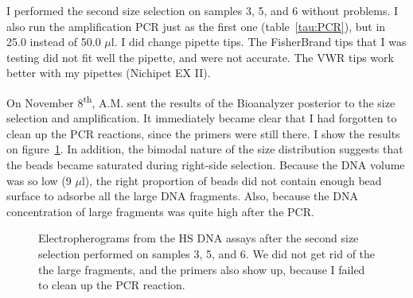\documentclass[a4paper,12pt]{article}
\begin{document}
I performed the second size selection on samples 3, 5, and 6 without problems. I also run the amplification PCR just as the first one (table~\ref{tau:PCR}), but in 25.0 instead of 50.0 $\mu$l. I did change pipette tips. The FisherBrand tips that I was testing did not fit well the pipette, and were not accurate. The VWR tips work better with my pipettes (Nichipet EX II).

On November 8\textsuperscript{th}, A.M. sent the results of the Bioanalyzer posterior to the size selection and amplification. It immediately became clear that I had forgotten to clean up the PCR reactions, since the primers were still there. I show the results on figure~\ref{fig:sizeselection2}. In addition, the bimodal nature of the size distribution suggests that the beads became saturated during right-side selection. Because the DNA volume was so low (9 $\mu$l), the right proportion of beads did not contain enough bead surface to adsorbe all the large DNA fragments. Also, because the DNA concentration of large fragments was quite high after the PCR.

\begin{figure}
\caption{Electropherograms from the HS DNA assays after the second size selection performed on samples 3, 5, and 6. We did not get rid of the the large fragments, and the primers also show up, because I failed to clean up the PCR reaction.}\label{fig:sizeselection2}
\end{figure}
\end{document}
